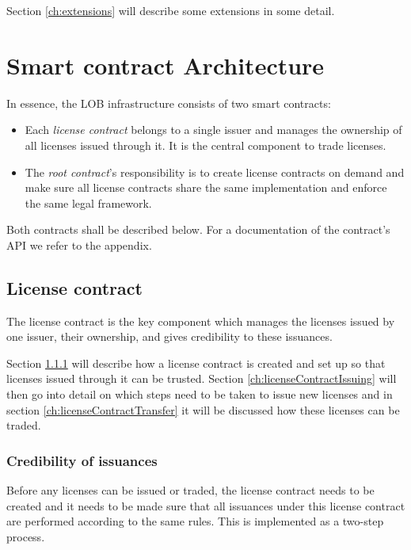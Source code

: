 \documentclass[a4paper]{article}
\begin{document}
Section \ref{ch:extensions} will describe some extensions in some detail.



\section{Smart contract Architecture}
\label{ch:smartContractArchitecture}

In essence, the LOB infrastructure consists of two smart contracts: 
\begin{itemize}
  \item Each \emph{license contract} belongs to a single issuer and manages the ownership of all licenses issued through it. It is the central component to trade licenses.
  \item The \emph{root contract}'s responsibility is to create license contracts on demand and make sure all license contracts share the same implementation and enforce the same legal framework.
\end{itemize}

Both contracts shall be described below. For a documentation of the contract's API we refer to the appendix.





\subsection{License contract}
The license contract is the key component which manages the licenses issued by one issuer, their ownership, and gives credibility to these issuances. 

Section \ref{ch:licenseContractCredibility} will describe how a license contract is created and set up so that licenses issued through it can be trusted. Section \ref{ch:licenseContractIssuing} will then go into detail on which steps need to be taken to issue new licenses and in section \ref{ch:licenseContractTransfer} it will be discussed how these licenses can be traded. 





\subsubsection{Credibility of issuances}
\label{ch:licenseContractCredibility}

Before any licenses can be issued or traded, the license contract needs to be created and it needs to be made sure that all issuances under this license contract are performed according to the same rules. This is implemented as a two-step process.
\end{document}
